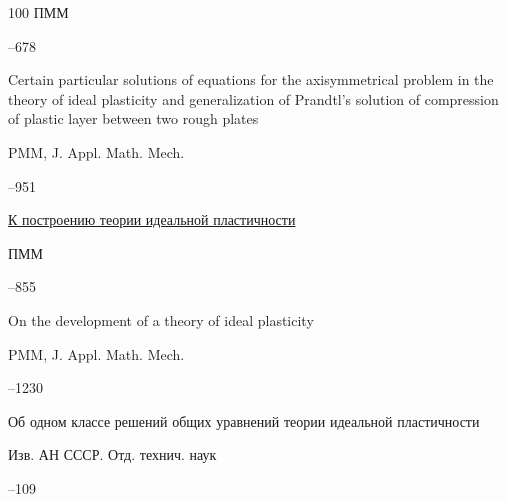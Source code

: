 \begin{thebibliography}{100}
\jour ПММ




–678


\transl


\paper Certain particular solutions of equations for the axisymmetrical problem in the theory of ideal plasticity and generalization of Prandtl's solution of compression of plastic layer between two rough plates

\jour PMM, J. Appl. Math. Mech. 


--951 






\paper \href{https://zbmath.org/?q=an:0096.39305}{К построению теории идеальной пластичности}

\jour ПММ




–855


\transl


\paper On the development of a theory of ideal plasticity

\jour PMM, J. Appl. Math. Mech. 


--1230 








\paper Об одном классе решений общих уравнений теории идеальной пластичности 

\jour Изв. АН СССР. Отд. технич. наук



–109




\end{thebibliography}
